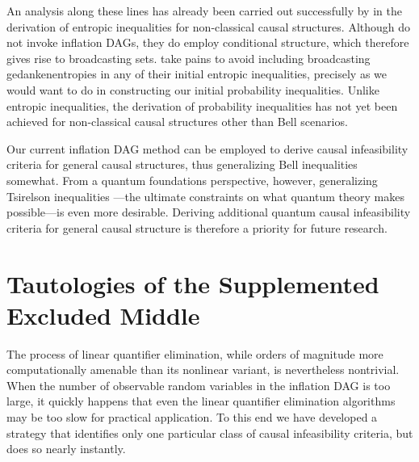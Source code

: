 An analysis along these lines has already been carried out successfully by \citet{Chaves2015infoquantum} in the derivation of entropic inequalities for non-classical causal structures. Although \citet{Chaves2015infoquantum} do not invoke inflation DAGs, they do employ conditional structure, which therefore gives rise to broadcasting sets. \citet{Chaves2015infoquantum} take pains to avoid including broadcasting gedankenentropies in any of their initial entropic inequalities, precisely as we would want to do in constructing our initial probability inequalities. Unlike entropic inequalities, the derivation of probability inequalities has not yet been achieved for non-classical causal structures other than Bell scenarios. 

Our current inflation DAG method can be employed to derive causal infeasibility criteria for general causal structures, thus generalizing Bell inequalities somewhat. From a quantum foundations perspective, however, generalizing Tsirelson inequalities \cite{Tsirelson1980,Brunner2013Bell}---the ultimate constraints on what quantum theory makes possible---is even more desirable. Deriving additional quantum causal infeasibility criteria for general causal structure is therefore a priority for future research. 


\section{Tautologies of the Supplemented Excluded Middle}\label{sec:TSEM}

The process of linear quantifier elimination, while orders of magnitude more computationally amenable than its nonlinear variant, is nevertheless nontrivial. When the number of observable random variables in the inflation DAG is too large, it quickly happens that even the linear quantifier elimination algorithms may be too slow for practical application. To this end we have developed a strategy that identifies only one particular class of causal infeasibility criteria, but does so nearly instantly.

